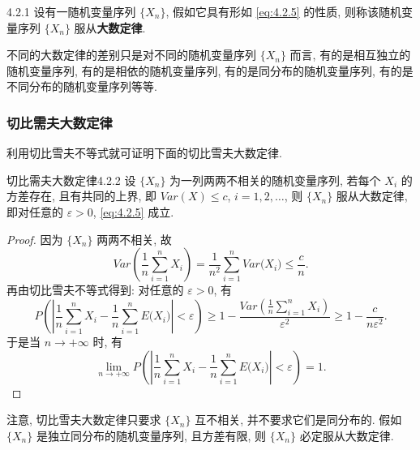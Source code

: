 \begin{definition}{}{4.2.1}
    设有一随机变量序列 $ \{ X_n \} $, 假如它具有形如 \eqref{eq:4.2.5} 的性质, 则称该随机变量序列 $ \{ X_n \} $ 服从\textbf{大数定律}.
\end{definition}

不同的大数定律的差别只是对不同的随机变量序列 $ \{ X_n \} $ 而言, 有的是相互独立的随机变量序列, 有的是相依的随机变量序列, 有的是同分布的随机变量序列, 有的是不同分布的随机变量序列等等.

\subsubsection{切比需夫大数定律}

利用切比雪夫不等式就可证明下面的切比雪夫大数定律.

\begin{theorem}{切比需夫大数定律}{4.2.2}
    设 $ \{ X_n \} $ 为一列两两不相关的随机变量序列, 若每个 $ X_i $ 的方差存在, 且有共同的上界, 即 $ Var (X) \le c $, $ i=1,2, \dotsc $, 则 $ \{ X_n \} $ 服从大数定律, 即对任意的 $ \varepsilon > 0 $,  \eqref{eq:4.2.5}  成立.
\end{theorem}

\begin{proof}
    因为 $ \{ X_n \} $ 两两不相关, 故
    \begin{equation*}
        Var \left( \frac{1}{n} \sum_{i=1}^n X_i \right) = \frac{1}{n^2} \sum_{i=1}^n Var \bigl( X_i \bigr) \leq \frac{c}{n}.
    \end{equation*}
    再由切比雪夫不等式得到: 对任意的 $ \varepsilon > 0 $, 有
    \begin{equation*}
        P \left( \left\lvert \frac{1}{n} \sum_{i=1}^n X_i - \frac{1}{n} \sum_{i=1}^n E \bigl( X_i \bigr) \right\rvert < \varepsilon \right) \geq 1 - \frac{Var\left( \frac{1}{n} \sum_{i=1}^n X_i \right)}{\varepsilon^2} \geq 1 - \frac{c}{n\varepsilon^2}.
    \end{equation*}
    于是当 $ n \to +\infty $ 时, 有
    \begin{equation*}
        \lim_{n \to +\infty} P \left( \left\lvert \frac{1}{n} \sum_{i=1}^n X_i - \frac{1}{n} \sum_{i=1}^n E \bigl( X_i \bigr) \right\rvert < \varepsilon \right) = 1.
    \end{equation*}
\end{proof}

注意, 切比雪夫大数定律只要求 $ \{ X_n \} $ 互不相关, 并不要求它们是同分布的.
假如 $ \{ X_n \} $ 是独立同分布的随机变量序列, 且方差有限, 则 $ \{ X_n \} $ 必定服从大数定律.

